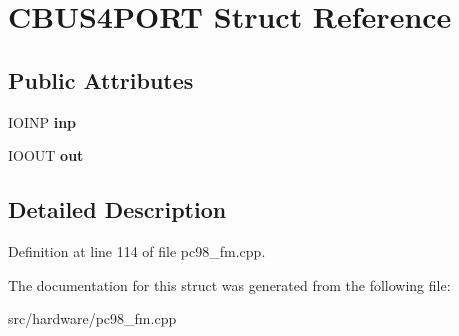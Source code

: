 \hypertarget{structCBUS4PORT}{\section{C\-B\-U\-S4\-P\-O\-R\-T Struct Reference}
\label{structCBUS4PORT}
}
\subsection*{Public Attributes}
\begin{DoxyCompactItemize}
\item 
\hypertarget{structCBUS4PORT_acdfa7680ca648b64bae4afc5b7ccf8a6}{I\-O\-I\-N\-P {\bfseries inp}}\label{structCBUS4PORT_acdfa7680ca648b64bae4afc5b7ccf8a6}

\item 
\hypertarget{structCBUS4PORT_ad38129fe2ce76c6bd2e1f1e6cd7948b3}{I\-O\-O\-U\-T {\bfseries out}}\label{structCBUS4PORT_ad38129fe2ce76c6bd2e1f1e6cd7948b3}

\end{DoxyCompactItemize}


\subsection{Detailed Description}


Definition at line 114 of file pc98\-\_\-fm.\-cpp.



The documentation for this struct was generated from the following file\-:\begin{DoxyCompactItemize}
\item 
src/hardware/pc98\-\_\-fm.\-cpp\end{DoxyCompactItemize}
